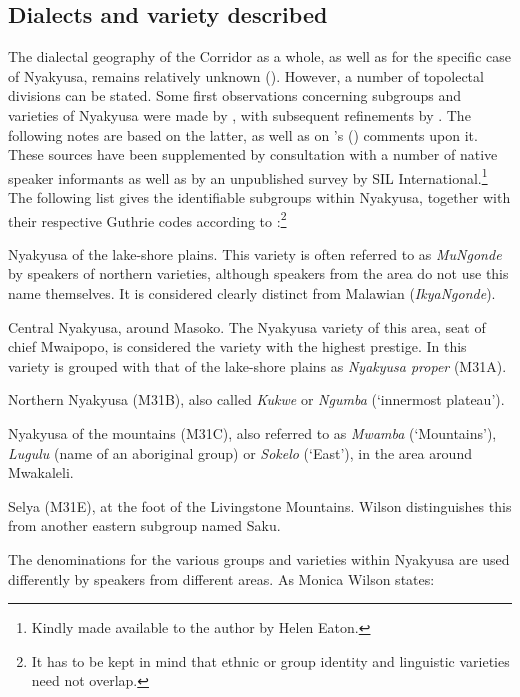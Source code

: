 \subsection{Dialects and variety described}\label{InternalClassiffication}
The dialectal geography of the Corridor as a whole, as well as for the specific case of Nyakyusa, remains relatively unknown (\citealt[4, 25]{WalshMSwillaI2002}). However, a number of topolectal divisions can be stated. Some first observations concerning subgroups and varieties of Nyakyusa were made by \citet[61]{JohnstonH1977}, with subsequent refinements by \citet[2]{WilsonM1963}. The following notes are based on the latter, as well as on \citeauthor{WalshMSwillaI2002}'s (\citeyear{WalshMSwillaI2002}) comments upon it. These sources have been supplemented by consultation with a number of native speaker informants as well as by an unpublished survey by SIL International.\footnote{Kindly made available to the author by Helen Eaton.} The following list gives the identifiable subgroups within Nyakyusa, together with their respective Guthrie codes according to \citet{MahoJ2009}:\footnote{It has to be kept in mind that ethnic or group identity and linguistic varieties need not overlap.}
\begin{compactitem}
\item Nyakyusa of the lake-shore plains. This variety is often referred to as \textit{MuNgonde} by speakers of northern varieties, although speakers from the area do not use this name themselves. It is considered clearly distinct from Malawian  (\mbox{\textit{IkyaNgonde}}).
\item Central Nyakyusa, around Masoko. The Nyakyusa variety of this area, seat of chief Mwaipopo, is considered the variety with the highest prestige. In \citet{MahoJ2009} this variety is grouped with that of the lake-shore plains as \textit{Nyakyusa proper} (M31A).
\item Northern Nyakyusa (M31B), also called \textit{Kukwe} or \textit{Ngumba} (`innermost plateau').
\item Nyakyusa of the mountains (M31C), also referred to as \textit{Mwamba} (`Mountains'), \textit{Lugulu} (name of an aboriginal group) or \textit{Sokelo} (`East'), in the area around Mwakaleli.
\item Selya (M31E), at the foot of the Livingstone Mountains. Wilson distinguishes this from another eastern subgroup named Saku.
\end{compactitem}
The denominations for the various groups and varieties within Nyakyusa are used differently by speakers from different areas. As Monica Wilson states:
